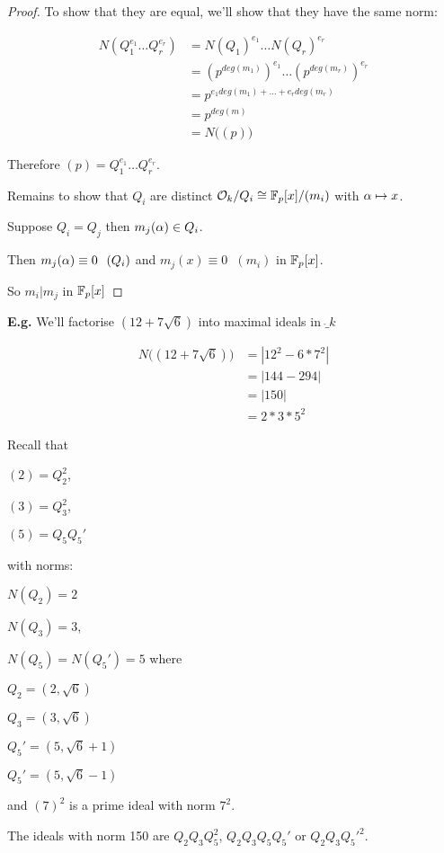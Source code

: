 \documentclass[11pt]{article}
\begin{document}
\begin{proof}
To show that they are equal, we'll show that they have the same norm:

	\begin{align*}
		N(Q_1^{e_1} \dots Q_r^{e_r} ) &= N(Q_1)^{e_1} \dots N(Q_r)^{e_r} \\
		&= (p^{deg(m_1)})^{e_1} \dots (p^{deg(m_r)})^{e_r} \\
		&= p^{e_1deg(m_1) + \dots + e_r deg(m_r)}\\
		&= p^{deg(m)}\\
		&= N\Big((p)\Big)
	\end{align*}

	Therefore $(p) = Q_1^{e_1} \dots Q_r^{e_r}$.
\spa

	Remains to show that $Q_i$ are distinct $\mathcal{O}_k /Q_i \cong \mathbb{F}_p[x] /(m_i) $ with $\alpha \mapsto x$.
\spa

	Suppose $Q_i = Q_j$ then $m_j (\alpha) \in Q_i$.
\spa

Then $m_j(\alpha) \equiv 0 \hspace{7pt} (Q_i) $ and $m_j (x) \equiv 0 \hspace{7pt} (m_i) $ in $\mathbb{F}_p[x]$.
\spa

So $m_i | m_j $ in $\mathbb{F}_p[x]$
\end{proof}
\spa
\textbf{E.g.}
We'll factorise $(12 + 7\sqrt6)$ into maximal ideals in $\ring_k$

\begin{align*}
	N\Big( (12+7\sqrt6) \Big) & = |12^2 - 6*7^2|\\
	& = |144 - 294|\\
	& = |150|\\
	& =2 *3*5^2 
\end{align*}

Recall that 

$(2) = Q_2^2 $, 

$(3)= Q_3^2 $,

$(5)= Q_5Q_5' $ 
\spa

with norms:

$N(Q_2) = 2$

$N(Q_3) = 3$,

$N(Q_5) = N(Q_5') = 5$ where 
\spa


$Q_2 = (2, \sqrt6 )$

$Q_3 = (3, \sqrt6 )$

$Q_5' = (5, \sqrt6 + 1 )$

$Q_5' = (5, \sqrt6  -1)$
\spa

and $(7)^2$ is a prime ideal with norm $7^2$.
\spa

The ideals with norm 150 are $Q_2Q_3Q_5^2$, $Q_2Q_3Q_5Q_5'$ or $Q_2Q_3Q_5'^2$.
\spa
\end{document}

